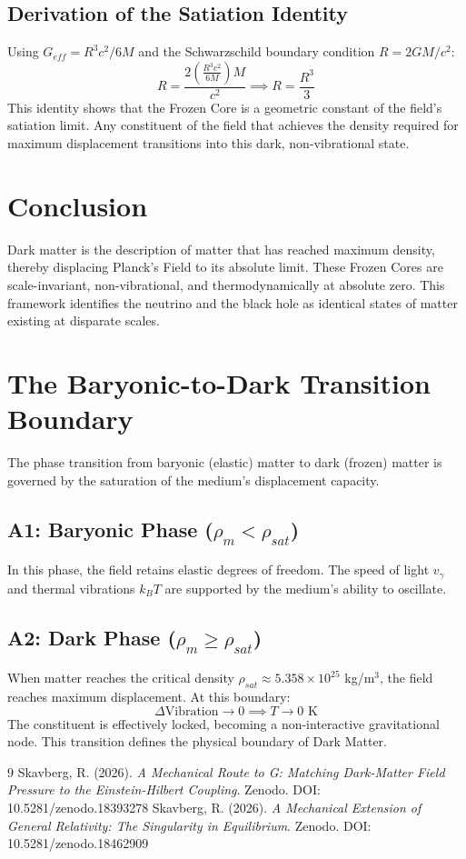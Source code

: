 \documentclass[12pt,a4paper]{article}
\begin{document}
\subsection{Derivation of the Satiation Identity}
Using $G_{eff} = R^3 c^2 / 6M$ and the Schwarzschild boundary condition $R = 2GM/c^2$:
\begin{equation}
R = \frac{2 \left( \frac{R^3 c^2}{6M} \right) M}{c^2} \implies R = \frac{R^3}{3}
\end{equation}
This identity shows that the Frozen Core is a geometric constant of the field's satiation limit. Any constituent of the field that achieves the density required for maximum displacement transitions into this dark, non-vibrational state.

\section{Conclusion}
Dark matter is the description of matter that has reached maximum density, thereby displacing Planck's Field to its absolute limit. These Frozen Cores are scale-invariant, non-vibrational, and thermodynamically at absolute zero. This framework identifies the neutrino and the black hole as identical states of matter existing at disparate scales.

\appendix
\section{The Baryonic-to-Dark Transition Boundary}
The phase transition from baryonic (elastic) matter to dark (frozen) matter is governed by the saturation of the medium's displacement capacity.

\subsection*{A1: Baryonic Phase ($\rho_m < \rho_{sat}$)}
In this phase, the field retains elastic degrees of freedom. The speed of light $v_{\gamma}$ and thermal vibrations $k_B T$ are supported by the medium's ability to oscillate.

\subsection*{A2: Dark Phase ($\rho_m \geq \rho_{sat}$)}
When matter reaches the critical density $\rho_{sat} \approx 5.358 \times 10^{25}$ kg/m$^3$, the field reaches maximum displacement. At this boundary:
\begin{equation}
\Delta \text{Vibration} \to 0 \implies T \to 0 \text{ K}
\end{equation}
The constituent is effectively locked, becoming a non-interactive gravitational node. This transition defines the physical boundary of Dark Matter.

\begin{thebibliography}{9}
 Skavberg, R. (2026). \textit{A Mechanical Route to G: Matching Dark-Matter Field Pressure to the Einstein-Hilbert Coupling}. Zenodo. DOI: 10.5281/zenodo.18393278
 Skavberg, R. (2026). \textit{A Mechanical Extension of General Relativity: The Singularity in Equilibrium}. Zenodo. DOI: 10.5281/zenodo.18462909
\end{thebibliography}
\end{document}
